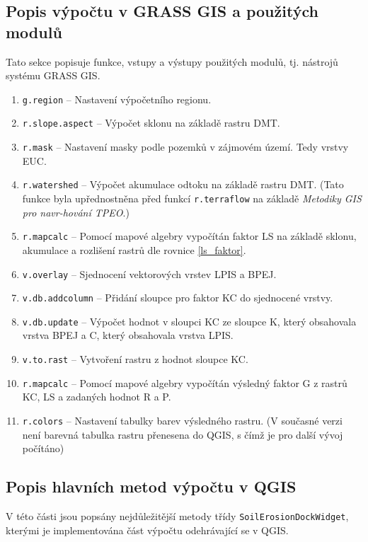 \subsection{Popis výpočtu v GRASS GIS a použitých modulů}
\label{popisgrass}
Tato sekce
popisuje funkce, vstupy a výstupy použitých modulů, tj. nástrojů systému GRASS GIS.
\begin{enumerate}
	\item \texttt{g.region} – Nastavení výpočetního regionu.
	\item \texttt{r.slope.aspect} – Výpočet sklonu na základě
          rastru DMT.
	\item \texttt{r.mask} – Nastavení masky podle pozemků v zájmovém území. 
	Tedy vrstvy EUC.
	\item \texttt{r.watershed} – Výpočet akumulace odtoku na
základě rastru DMT. (Tato funkce byla upřednostněna před funkcí
\texttt{r.terraflow} na základě \textit{Metodiky GIS pro navr-hování
TPEO}\cite{Dostal2014}.)
	\item \texttt{r.mapcalc} – Pomocí mapové algebry vypočítán
faktor LS na základě sklonu, akumulace a rozlišení rastrů dle rovnice
\ref{ls_faktor}.
	\item \texttt{v.overlay} – Sjednocení vektorových vrstev LPIS
a BPEJ.
	\item \texttt{v.db.addcolumn} – Přidání sloupce pro faktor KC
do sjednocené vrstvy.
	\item \texttt{v.db.update} – Výpočet hodnot v sloupci KC ze
sloupce K, který obsahovala vrstva BPEJ a C, který obsahovala vrstva
LPIS.
	\item \texttt{v.to.rast} – Vytvoření rastru z hodnot sloupce
KC.
	\item \texttt{r.mapcalc} – Pomocí mapové algebry vypočítán
výsledný faktor G z rastrů KC, LS a zadaných hodnot R a P.
	\item \texttt{r.colors} – Nastavení tabulky barev výsledného rastru. (V
současné verzi není barevná tabulka rastru přenesena do QGIS, s čímž
je pro další vývoj počítáno)
\end{enumerate}
\newpage
\subsection{Popis hlavních metod výpočtu v QGIS} V této části jsou
popsány nejdůležitější metody třídy \texttt{SoilErosionDockWidget},
kterými je implementována část výpočtu odehrávající se v QGIS.
